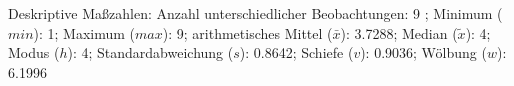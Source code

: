 				\label{tableValues:bsch16b}
				\vspace*{-\baselineskip}
                    \begin{noten}
                	    \note{} Deskriptive Maßzahlen:
                	    Anzahl unterschiedlicher Beobachtungen: 9%
                	    ; 
                	      Minimum ($min$): 1; 
                	      Maximum ($max$): 9; 
                	      arithmetisches Mittel ($\bar{x}$): \num[round-mode=places,round-precision=2]{3.7288}; 
                	      Median ($\tilde{x}$): 4; 
                	      Modus ($h$): 4; 
                	      Standardabweichung ($s$): \num[round-mode=places,round-precision=2]{0.8642}; 
                	      Schiefe ($v$): \num[round-mode=places,round-precision=2]{0.9036}; 
                	      Wölbung ($w$): \num[round-mode=places,round-precision=2]{6.1996}
                     \end{noten}


